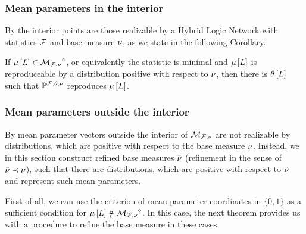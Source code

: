 \subsubsection{Mean parameters in the interior}

By  the interior points are those realizable by a Hybrid Logic Network with statistics $\mathcal{F}$ and base measure $\nu$, as we state in the following Corollary.

\begin{corollary}
	If $\mu\left[L\right]\in{\mathcal{M}_{\mathcal{F},\nu}}^{\circ}$, or equivalently the statistic is minimal and $\mu\left[L\right]$ is reproduceable by a distribution positive with respect to $\nu$, then there is $\theta\left[L\right]$ such that $\mathbb{P}^{\mathcal{F},\theta,\nu}$ reproduces $\mu\left[L\right]$.
\end{corollary}

\subsubsection{Mean parameters outside the interior}

By  mean parameter vectors outside the interior of $\mathcal{M}_{\mathcal{F},\nu}$ are not realizable by distributions, which are positive with respect to the base measure $\nu$.
Instead, we in this section construct refined base measures $\tilde{\nu}$ (refinement in the sense of $\tilde{\nu}\prec\nu$), such that there are distributions, which are positive with respect to $\tilde{\nu}$ and represent such mean parameters.


First of all, we can use the criterion of mean parameter coordinates in $\{0,1\}$ as a sufficient condition for $\mu\left[L\right]\notin{\mathcal{M}_{\mathcal{F},\nu}}^{\circ}$.
In this case, the next theorem provides us with a procedure to refine the base measure in these cases.

